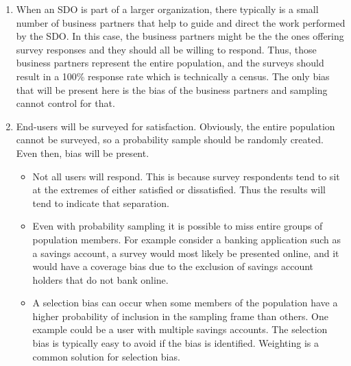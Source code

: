 \documentclass[SDSUThesis.tex]{subfiles}
\begin{document}
\begin{description}
\begin{enumerate}
                        \item When an SDO is part of a larger organization, there typically is
                        a small number of business partners that help to guide and 
                        direct the work performed by the SDO.  In this case, the business 
                        partners might be the the ones offering survey responses and they 
                        should all be willing to respond.  Thus, those business partners 
                        represent the entire population, and the surveys should result in 
                        a 100\% response rate which is technically a census.  
                        The only bias that will be present here is the bias of the business 
                        partners and sampling cannot control for that.
               
                        \item End-users will be surveyed for satisfaction. Obviously, the 
                        entire population cannot be surveyed, so a probability sample should 
                        be randomly created. Even then, bias will be present.  
                        \begin{itemize}
                            \item Not all users will respond.  This is because survey 
                                respondents tend to sit at the extremes of either 
                                satisfied or dissatisfied.  Thus the results will tend 
                                to indicate that separation. 
                            \item  Even with probability sampling it is possible to miss 
                                entire groups of population members. For example consider a 
                                banking application such as a savings account, a survey would 
                                most likely be presented online, and it would have a coverage 
                                bias due to the exclusion of savings account holders that 
                                do not bank online.
                            \item A selection bias can occur when some members of the 
                                population have a higher probability of inclusion in 
                                the sampling frame than others.  One example could be 
                                a user with multiple savings accounts.  The selection 
                                bias is typically easy to avoid if the bias is 
                                identified.  Weighting is a common solution for selection bias. 
                        \end{itemize}
                   
                    \end{enumerate}
                
                \end{description}
                
\end{document}
